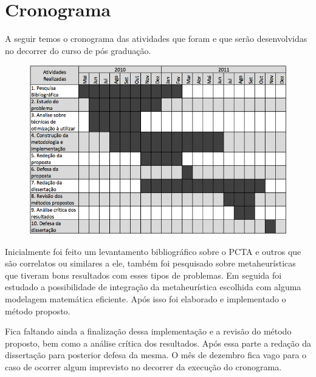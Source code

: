 \chapter*{Cronograma}

A seguir temos o cronograma das atividades que foram e que serão desenvolvidas no decorrer do curso de pós graduação.
    
\begin{figure}[ht]
	\centering
	\includegraphics[scale=0.48]{./img/cronograma}
	\label{cronograma}
 \end{figure}
    
Inicialmente foi feito um levantamento bibliográfico sobre o PCTA e outros que são correlatos ou similares a ele, também foi pesquisado sobre metaheurísticas que tiveram bons resultados com esses tipos de problemas. Em seguida foi estudado a possibilidade de integração da metaheurística escolhida com alguma modelagem matemática eficiente. Após isso foi elaborado e implementado o método proposto.

Fica faltando ainda a finalização dessa implementação e a revisão do método proposto, bem como a análise crítica dos resultados. Após essa parte a redação da dissertação para posterior defesa da mesma. O mês de dezembro fica vago para o caso de ocorrer algum imprevisto no decorrer da execução do cronograma.
